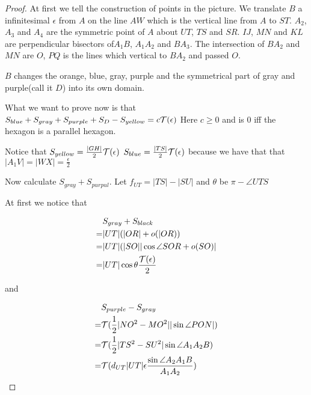 \begin{proof}
	At first we tell the construction of points in the picture.
	We translate $B$ a infinitesimal $\epsilon$ from $A$ on the line $AW$
	which is the vertical line from $A$ to $ST$. $A_2$, $A_3$ and $A_4$ are
	the symmetric point of $A$ about $UT$, $TS$ and $SR$. $IJ$, $MN$ and 
	$KL$ are perpendicular bisectors of$A_1B$, $A_1A_2$ and $BA_3$. 
	The intersection of $BA_2$ and $MN$ are $O$, $PQ$ is the lines which 
	vertical to $BA_2$ and passed $O$.
		
	$B$ changes the orange, blue, gray, purple and the symmetrical part
	of gray and purple(call it $D$) into its own domain. 
	
	What we want to prove now is that $S_{blue} + S_{gray} +
	S_{purple} + S_{D} - S_{yellow} = c\mathcal{T}(\epsilon) $ 
	Here $c\geq0$ and is $0$ iff the
	hexagon is a parallel hexagon.
		
	Notice that $S_{yellow} = \frac{|GH|}{2}\mathcal{T}(\epsilon)$ $S_{blue} = \frac{|TS|}{2}\mathcal{T}(\epsilon)$ because we have that that $|A_1V| = |WX| = \frac{\epsilon}{2}$
		
	Now calculate $S_{gray}+S_{purpul}$. Let $f_{UT} = |TS| - |SU|$ 
	and $\theta$ be $\pi - \angle UTS$
		
	At first we notice that 
		
	\begin{equation}
		\begin{split}
		&S_{gray} + S_{black}\\
		=&|UT|(|OR| + o(|OR))\\
		=&|UT|(|SO||\cos \angle SOR + o(SO)|\\
		=&|UT|\cos\theta \frac{\mathcal{T}(\epsilon)}{2}
		\end{split}
	\end{equation}
		
		and	
		
	\begin{equation}
		\begin{split}
		&S_{purple} - S_{gray}\\
		=&\mathcal{T}(\frac{1}{2}|NO^2 - MO^2||\sin\angle PON|)\\
		=&\mathcal{T}(\frac{1}{2}|TS^2 - SU^2|\sin \angle A_1A_2B)\\
		=&\mathcal{T}(d_{UT}|UT|\epsilon\frac{\sin \angle A_2A_1B}{A_1A_2})
		\end{split}
	\end{equation}
		

\end{proof}
